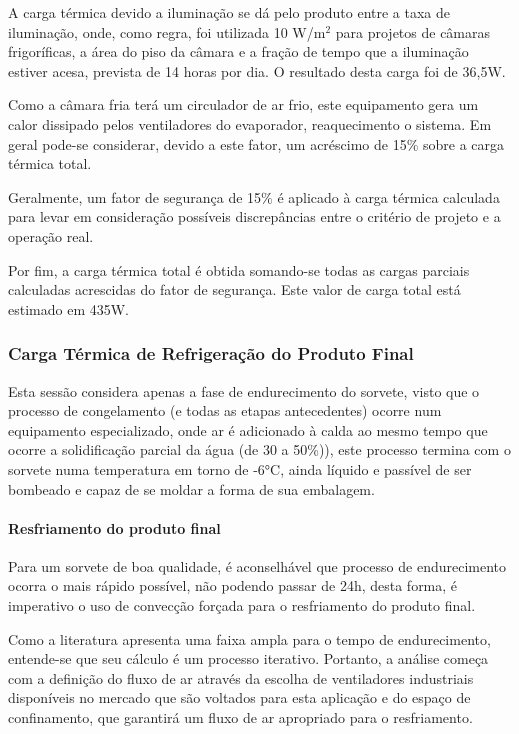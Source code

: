 \documentclass[10pt,a4paper]{article}
\begin{document}
A carga térmica devido a iluminação se dá pelo produto entre a taxa de iluminação, onde, como regra, foi utilizada 10 W/m$^{2}$  para projetos de câmaras frigoríficas, a área do piso da câmara e a fração de tempo que a iluminação estiver acesa, prevista de 14 horas por dia. O resultado desta carga foi de 36,5W.

Como a câmara fria terá um circulador de ar frio, este equipamento gera um calor dissipado pelos ventiladores do evaporador, reaquecimento o sistema. Em geral pode-se considerar, devido a este fator, um acréscimo de 15$\%$ sobre a carga térmica total.  

Geralmente, um fator de segurança de 15$\%$ é aplicado à carga térmica calculada para levar em consideração possíveis discrepâncias entre o critério de projeto e a operação real. 

Por fim, a carga térmica total é obtida somando-se todas as cargas parciais calculadas acrescidas do fator de segurança. Este valor de carga total está estimado em 435W.

\subsubsection{{ Carga Térmica de Refrigeração do Produto Final}}

Esta sessão considera apenas a fase de endurecimento do sorvete, visto que o processo de congelamento (e todas as etapas antecedentes) ocorre num equipamento especializado, onde ar é adicionado à calda ao mesmo tempo que ocorre a solidificação parcial da água (de 30 a 50\%)), este processo termina com o sorvete numa temperatura em torno de -6°C, ainda líquido e passível de ser bombeado e capaz de se moldar a forma de sua embalagem.

\paragraph*{{ Resfriamento do produto final}}
Para um sorvete de boa qualidade, é aconselhável que processo de endurecimento ocorra o mais rápido possível, não podendo passar de 24h, desta forma, é imperativo o uso de convecção forçada para o resfriamento do produto final.

Como a literatura apresenta uma faixa ampla para o tempo de endurecimento, entende-se que seu cálculo é um processo iterativo. Portanto, a análise começa com a definição do fluxo de ar através da escolha de ventiladores industriais disponíveis no mercado que são voltados para esta aplicação e do espaço de confinamento, que garantirá um fluxo de ar apropriado para o resfriamento. 
\end{document}
